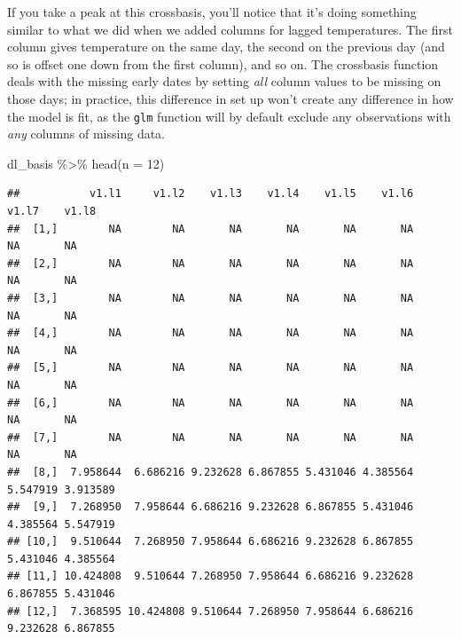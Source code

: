 \documentclass[
]{book}
\newenvironment{Shaded}{\begin{snugshade}}{\end{snugshade}}
\newcommand{\AttributeTok}[1]{\textcolor[rgb]{0.77,0.63,0.00}{#1}}
\newcommand{\DecValTok}[1]{\textcolor[rgb]{0.00,0.00,0.81}{#1}}
\newcommand{\FunctionTok}[1]{\textcolor[rgb]{0.00,0.00,0.00}{#1}}
\newcommand{\NormalTok}[1]{#1}
\newcommand{\OtherTok}[1]{\textcolor[rgb]{0.56,0.35,0.01}{#1}}
\newcommand{\SpecialCharTok}[1]{\textcolor[rgb]{0.00,0.00,0.00}{#1}}
\newcommand{\StringTok}[1]{\textcolor[rgb]{0.31,0.60,0.02}{#1}}
\begin{document}
\begin{Shaded}
\end{Shaded}

If you take a peak at this crossbasis, you'll notice that it's doing something similar to
what we did when we added columns for lagged temperatures. The first column gives temperature
on the same day, the second on the previous day (and so is offset one down from the first
column), and so on. The crossbasis function deals with the missing early dates by setting
\emph{all} column values to be missing on those days; in practice, this difference in set up
won't create any difference in how the model is fit, as the \texttt{glm} function will by default
exclude any observations with \emph{any} columns of missing data.

\begin{Shaded}
\begin{Highlighting}[]
\NormalTok{dl\_basis }\SpecialCharTok{\%\textgreater{}\%} 
  \FunctionTok{head}\NormalTok{(}\AttributeTok{n =} \DecValTok{12}\NormalTok{)}
\end{Highlighting}
\end{Shaded}

\begin{verbatim}
##           v1.l1     v1.l2    v1.l3    v1.l4    v1.l5    v1.l6    v1.l7    v1.l8
##  [1,]        NA        NA       NA       NA       NA       NA       NA       NA
##  [2,]        NA        NA       NA       NA       NA       NA       NA       NA
##  [3,]        NA        NA       NA       NA       NA       NA       NA       NA
##  [4,]        NA        NA       NA       NA       NA       NA       NA       NA
##  [5,]        NA        NA       NA       NA       NA       NA       NA       NA
##  [6,]        NA        NA       NA       NA       NA       NA       NA       NA
##  [7,]        NA        NA       NA       NA       NA       NA       NA       NA
##  [8,]  7.958644  6.686216 9.232628 6.867855 5.431046 4.385564 5.547919 3.913589
##  [9,]  7.268950  7.958644 6.686216 9.232628 6.867855 5.431046 4.385564 5.547919
## [10,]  9.510644  7.268950 7.958644 6.686216 9.232628 6.867855 5.431046 4.385564
## [11,] 10.424808  9.510644 7.268950 7.958644 6.686216 9.232628 6.867855 5.431046
## [12,]  7.368595 10.424808 9.510644 7.268950 7.958644 6.686216 9.232628 6.867855
\end{verbatim}
\end{document}
